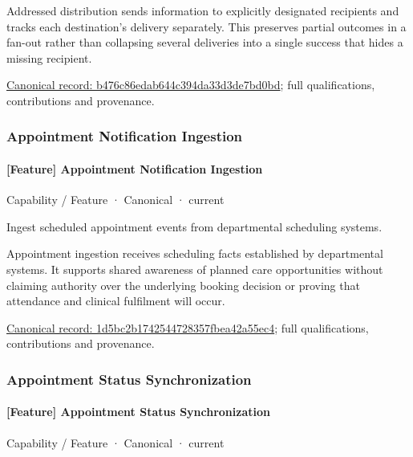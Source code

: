 Addressed distribution sends information to explicitly designated recipients and tracks each destination's delivery separately. This preserves partial outcomes in a fan-out rather than collapsing several deliveries into a single success that hides a missing recipient.


{\footnotesize \href{../../../../continuum/strategy/capability/feature/b476c86edab644c394da33d3de7bd0bd.md}{Canonical record: b476c86edab644c394da33d3de7bd0bd}; full qualifications, contributions and provenance.}\par
\subsubsection{Appointment Notification Ingestion}

\paragraph{[Feature] Appointment Notification Ingestion}

\label{element:1d5bc2b1742544728357fbea42a55ec4}
{\small Capability / Feature · Canonical · current}\par

Ingest scheduled appointment events from departmental scheduling systems.



Appointment ingestion receives scheduling facts established by departmental systems. It supports shared awareness of planned care opportunities without claiming authority over the underlying booking decision or proving that attendance and clinical fulfilment will occur.


{\footnotesize \href{../../../../continuum/strategy/capability/feature/1d5bc2b1742544728357fbea42a55ec4.md}{Canonical record: 1d5bc2b1742544728357fbea42a55ec4}; full qualifications, contributions and provenance.}\par
\subsubsection{Appointment Status Synchronization}

\paragraph{[Feature] Appointment Status Synchronization}

\label{element:a7a9932600d84434a1a37005f726747d}
{\small Capability / Feature · Canonical · current}\par

